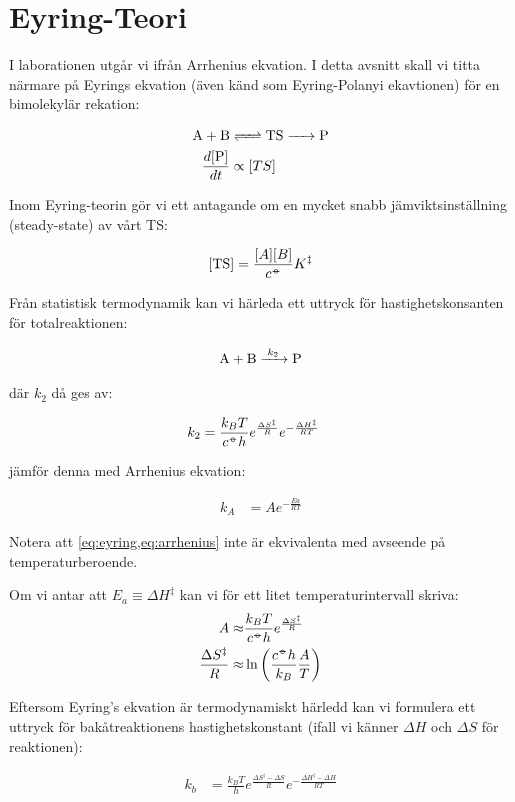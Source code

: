 \section{Eyring-Teori}
\label{sec:eyring}
I laborationen utgår vi ifrån Arrhenius ekvation. I detta avsnitt
skall vi titta närmare på Eyrings ekvation (även känd som Eyring-Polanyi ekavtionen)
för en bimolekylär rekation:

\begin{align}
  \label{eq:ts}
  \ce{A + B} & \ce{<=> TS -> P} \\
  \label{eq:dpdt-propto}
  \frac{d[\ce{P}]}{dt} &\propto [TS]
\end{align}

Inom Eyring-teorin gör vi ett antagande om en mycket snabb
jämviktsinställning (steady-state) av vårt TS:

\begin{equation}
  \label{eq:ts-conc}
  [\ce{TS}] = \frac{[A][B]}{c^\plimsoll}K^\ddagger
\end{equation}

Från statistisk termodynamik kan vi härleda ett uttryck för
hastighetskonsanten för totalreaktionen:

\begin{align}
  \ce{A + B ->[k_2] P}
\end{align}

där $k_2$ då ges av:

\begin{align}
  \label{eq:eyring}
  k_2 &= \frac{k_B T}{c^{-\kern-5pt{\circ}\kern-5pt-} h} e^{\frac{\Delta S^\ddagger}{R}} e^{-\frac{\Delta H^\ddagger}{RT}}
\end{align}

jämför denna med Arrhenius ekvation:

\begin{align}
  \label{eq:arrhenius}
  k_A &= A e^{-\frac{Ea}{RT}}
\end{align}

Notera att \cref{eq:eyring,eq:arrhenius} inte är ekvivalenta med avseende
på temperaturberoende. 

Om vi antar att $E_a \equiv \Delta H^\ddagger$ kan vi för ett litet
temperaturintervall skriva:
\begin{align}
  A \approx& \frac{k_B T}{c^{-\kern-5pt{\circ}\kern-5pt-} h} e^{\frac{\Delta S^\ddagger}{R}}\\
  \frac{\Delta S^\ddagger}{R} \approx& \ln\left(\frac{c^{-\kern-5pt{\circ}\kern-5pt-} h}{k_B}
                                       \frac{A}{T}\right) 
\end{align}

Eftersom Eyring's ekvation är termodynamiskt härledd kan vi formulera ett
uttryck för bakåtreaktionens hastighetskonstant (ifall vi känner $\Delta H$ och $\Delta S$
för reaktionen):

\begin{align}
  k_b &= \frac{k_B T}{h} e^{\frac{\Delta S^\ddagger - \Delta S}{R}}
        e^{-\frac{\Delta H^\ddagger - \Delta H}{RT}}
\end{align}

